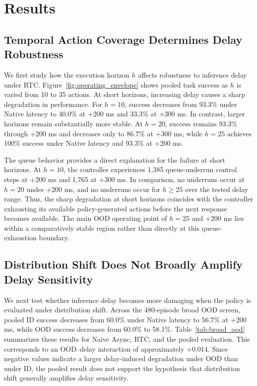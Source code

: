 \documentclass{article}
\begin{document}
\section{Results}

\subsection{Temporal Action Coverage Determines Delay Robustness}

We first study how the execution horizon \(h\) affects robustness to inference delay under RTC. Figure~\ref{fig:operating_envelope} shows pooled task success as \(h\) is varied from 10 to 35 actions. At short horizons, increasing delay causes a sharp degradation in performance. For \(h=10\), success decreases from 93.3\% under Native latency to 40.0\% at +200 ms and 33.3\% at +300 ms. In contrast, larger horizons remain substantially more stable. At \(h=20\), success remains 93.3\% through +200 ms and decreases only to 86.7\% at +300 ms, while \(h=25\) achieves 100\% success under Native latency and 93.3\% at +200 ms.

The queue behavior provides a direct explanation for the failure at short horizons. At \(h=10\), the controller experiences 1,385 queue-underrun control steps at +200 ms and 1,765 at +300 ms. In comparison, no underruns occur at \(h=20\) under +200 ms, and no underruns occur for \(h\geq25\) over the tested delay range. Thus, the sharp degradation at short horizons coincides with the controller exhausting its available policy-generated actions before the next response becomes available. The main OOD operating point of \(h=25\) and +200 ms lies within a comparatively stable region rather than directly at this queue-exhaustion boundary.

\subsection{Distribution Shift Does Not Broadly Amplify Delay Sensitivity}

We next test whether inference delay becomes more damaging when the policy is evaluated under distribution shift. Across the 480-episode broad OOD screen, pooled ID success decreases from 60.0\% under Native latency to 56.7\% at +200 ms, while OOD success decreases from 60.0\% to 58.1\%. Table~\ref{tab:broad_ood} summarizes these results for Naive Async, RTC, and the pooled evaluation. This corresponds to an OOD--delay interaction of approximately \(+0.014\). Since negative values indicate a larger delay-induced degradation under OOD than under ID, the pooled result does not support the hypothesis that distribution shift generally amplifies delay sensitivity.
\end{document}
